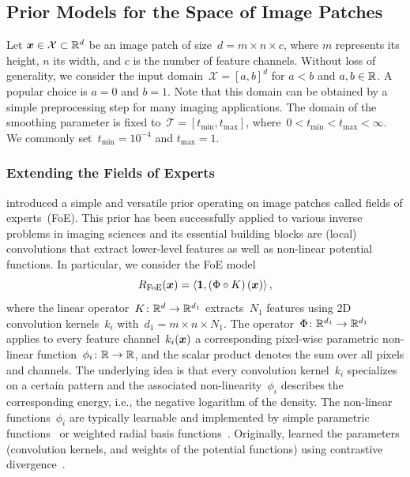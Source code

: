 \documentclass{article} %
\theoremstyle{plain}
\theoremstyle{definition}
\theoremstyle{remark}
\newcommand{\X}{\mathcal{X}}
\newcommand{\T}{\mathcal{T}}
\newcommand{\scal}[2]{\left\langle#1,#2\right\rangle}
\renewcommand{\vec}[1]{\mathbf{#1}}
\newcommand{\tmin}{t_\mathrm{min}}
\newcommand{\tmax}{t_\mathrm{max}}
\begin{document}
\subsection{Prior Models for the Space of Image Patches}
Let $\vx\in\X\subset\R^d$ be an image patch of size~$d=m\times n\times c$, where $m$ represents its height, $n$ its width, and $c$ is the number of feature channels.
Without loss of generality, we consider the input domain~$\X=[a,b]^d$ for $a<b$ and $a,b\in\mathbb{R}$.
A popular choice is $a=0$ and $b=1$.
Note that this domain can be obtained by a simple preprocessing step for many imaging applications.
The domain of the smoothing parameter is fixed to~$\T=[\tmin,\tmax]$, where~$0<\tmin<\tmax<\infty$.
We commonly set~$\tmin=10^{-4}$ and $\tmax=1$.

\subsubsection{Extending the Fields of Experts}
\citet{RoBl09} introduced a simple and versatile prior operating on image patches called fields of experts~(FoE).
This prior has been successfully applied to various inverse problems in imaging sciences and its essential building blocks are (local) convolutions that extract lower-level features as well as non-linear potential functions.
In particular, we consider the FoE model
\[
R_\mathrm{FoE}(\vx) = \scal{\vec{1}}{\left(\Phi \circ K\right)(\vx)},
\]
where the linear operator~$K\colon\mathbb{R}^d\to\mathbb{R}^{d_1}$ extracts~$N_1$ features using 2D convolution kernels~$k_i$ with~$d_1=m\times n\times N_1$.
The operator~$\Phi\colon\mathbb{R}^{d_1}\to\mathbb{R}^{d_1}$ applies to every feature channel~$k_i({\bm{x}})$ a corresponding pixel-wise parametric non-linear function~$\phi_i\colon\mathbb{R}\to\mathbb{R}$, and the scalar product denotes the sum over all pixels and channels.
The underlying idea is that every convolution kernel~$k_i$ specializes on a certain pattern and the associated non-linearity~$\phi_i$ describes the corresponding energy, i.e., the negative logarithm of the density.
The non-linear functions~$\phi_i$ are typically learnable and implemented by simple parametric functions~\citep{RoBl09,ChRa14} or weighted radial basis functions~\citep{ChPo16,KoKl17}.
Originally, \citet{RoBl09} learned the parameters (convolution kernels, and weights of the potential functions) using contrastive divergence~\citep{Hi02}.
\end{document}

